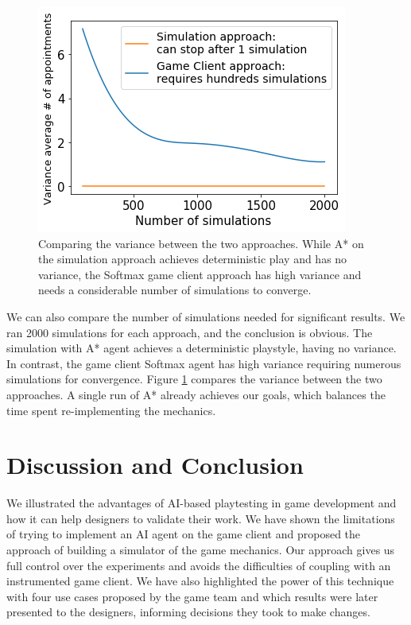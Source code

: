 \documentclass[letterpaper]{article} %
\begin{document}
\begin{figure}[t]
  \centering
  \includegraphics[width=0.943\linewidth]{images/career_average.png}
  \caption{Comparing the variance between the two approaches. While A* on the simulation approach achieves deterministic play and has no variance, the Softmax game client approach has high variance and needs a considerable number of simulations to converge.}
  \label{Figure:approach_variance_comp}
\end{figure}

We can also compare the number of simulations needed for significant results. We ran 2000 simulations for each approach, and the conclusion is obvious. The simulation with A* agent achieves a deterministic playstyle, having no variance. In contrast, the game client Softmax agent has high variance requiring numerous simulations for convergence. Figure \ref{Figure:approach_variance_comp} compares the variance between the two approaches. A single run of A* already achieves our goals, which balances the time spent re-implementing the mechanics.

\section{Discussion and Conclusion}

We illustrated the advantages of AI-based playtesting in game development and how it can help designers to validate their work. We have shown the limitations of trying to implement an AI agent on the game client and proposed the approach of building a simulator of the game mechanics. Our approach gives us full control over the experiments and avoids the difficulties of coupling with an instrumented game client. We have also highlighted the power of this technique with four use cases proposed by the game team and which results were later presented to the designers, informing decisions they took to make changes.
% 
% 
\end{document}
